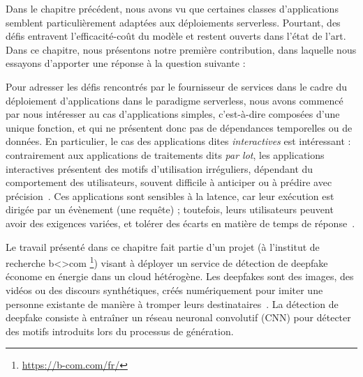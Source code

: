 Dans le chapitre précédent, nous avons vu que certaines classes d'applications semblent particulièrement adaptées aux déploiements serverless. Pourtant, des défis entravent l'efficacité-coût du modèle et restent ouverts dans l'état de l'art. Dans ce chapitre, nous présentons notre première contribution, dans laquelle nous essayons d'apporter une réponse à la question suivante : 


Pour adresser les défis rencontrés par le fournisseur de services dans le cadre du déploiement d'applications dans le paradigme serverless, nous avons commencé par nous intéresser au cas d'applications simples, c'est-à-dire composées d'une unique fonction, et qui ne présentent donc pas de dépendances temporelles ou de données. En particulier, le cas des applications dites \textit{interactives} est intéressant : contrairement aux applications de traitements dits \textit{par lot}, les applications interactives présentent des motifs d'utilisation irréguliers, dépendant du comportement des utilisateurs, souvent difficile à anticiper ou à prédire avec précision~\cite{shahradServerlessWildCharacterizing, cncf2018whitepaper}. Ces applications sont sensibles à la latence, car leur exécution est dirigée par un évènement (une requête) ; toutefois, leurs utilisateurs peuvent avoir des exigences variées, et tolérer des écarts en matière de temps de réponse~\cite{buyyaSLAorientedResourceProvisioning2011}.

Le travail présenté dans ce chapitre fait partie d'un projet (à l'institut de recherche b{\textless\textgreater}com \footnote{\href{https://b-com.com/fr/}{https://b-com.com/fr/}}) visant à déployer un service de détection de deepfake économe en énergie dans un cloud hétérogène. Les deepfakes sont des images, des vidéos ou des discours synthétiques, créés numériquement pour imiter une personne existante de manière à tromper leurs destinataires~\cite{westerlundEmergenceDeepfakeTechnology2019}. La détection de deepfake consiste à entraîner un réseau neuronal convolutif (CNN) pour détecter des motifs introduits lors du processus de génération.

